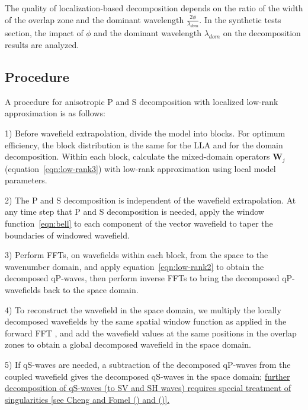 \documentclass[manuscript,ulem,graphix,revised]{geophysics}
\begin{document}
The quality of localization-based decomposition depends on the ratio of the width of the overlap zone and the dominant wavelength $\frac{2\phi}{\lambda_{dom}}$. In the synthetic tests section, the impact of $\phi$ and the dominant wavelength $\lambda_{dom}$ on the decomposition results are analyzed.

\subsection{Procedure}
\indent\indent
A procedure for anisotropic P and S decomposition with localized low-rank approximation is as follows:
\begin{hangparas}{.25in}{1}

1) Before wavefield extrapolation, divide the model into blocks. For optimum efficiency, the block distribution is the same for the LLA and for the domain decomposition.  Within each block, calculate the mixed-domain operators $\boldsymbol{W}_j$ (equation~\ref{eqn:low-rank3}) with low-rank approximation using local model parameters.

2) 
The P and S decomposition is independent of the wavefield extrapolation. At any time step that P and S decomposition is needed, apply the window function~\ref{eqn:bell} to each component of the vector wavefield to taper the boundaries of windowed wavefield.

3) Perform FFTs, on wavefields within each block, from the space to the wavenumber domain, and apply equation~\ref{eqn:low-rank2} to obtain the decomposed qP-waves, then perform inverse FFTs to bring the decomposed qP-wavefields back to the space domain.


4) To reconstruct the wavefield in the space domain, we multiply the locally decomposed wavefields by the same spatial window function as applied in the forward FFT \citep{crochiere80}, and add the wavefield values at the same positions in the overlap zones to obtain a global decomposed wavefield in the space domain.

5) If qS-waves are needed, a subtraction of the decomposed qP-waves from the coupled wavefield gives the decomposed qS-waves in the space domain; \marginnote{[20, 21, 38]}\uline{further decomposition of qS-waves (to SV and SH waves) requires special treatment of singularities [see Cheng and Fomel (\mbox{\citeyear{cheng14}}) and \mbox{\citeauthor{Sripanich16}} (\mbox{\citeyear{Sripanich16}})].}
\end{hangparas}
\end{document}
